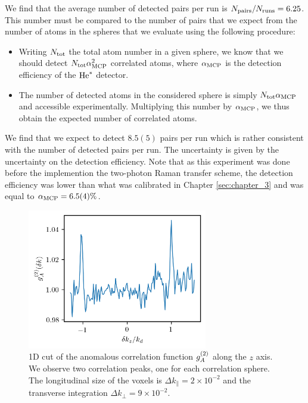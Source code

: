 We find that the average number of detected pairs per run is $N_{\rm{pairs}}/N_{\rm{runs}}=6.25$. This number must be compared to the number of pairs that we expect from the number of atoms in the spheres that we evaluate using the following procedure:

\begin{itemize}
    \item Writing $N_{\rm{tot}}$ the total atom number in a given sphere, we know that we should detect $N_{\rm{tot}} \alpha_{\rm{MCP}}^2$ correlated atoms, where $\alpha_{\rm{MCP}}$ is the detection efficiency of the $\mathrm{He}^*$ detector. 
    \item The number of detected atoms in the considered sphere is simply $N_{\rm{tot}} \alpha_{\rm{MCP}}$ and accessible experimentally. Multiplying this number by $\alpha_{\rm{MCP}}$, we thus obtain the expected number of correlated atoms.
\end{itemize}

We find that we expect to detect $8.5(5)$ pairs per run which is rather consistent with the number of detected pairs per run. The uncertainty is given by the uncertainty on the detection efficiency. Note that as this experiment was done before the implemention the two-photon Raman transfer scheme, the detection efficiency was lower than what was calibrated in Chapter \ref{sec:chapter_3} and was equal to $\alpha_{\rm{MCP}}=6.5(4) \%$.




\begin{figure}
    \centering
    \includegraphics[width=0.7\textwidth]{Fig/Chapter4/kmk_kapitza.png}
    \caption[1D cut of the anomalous correlation function $\gtwo_A$ along the $z$ axis]{1D cut of the anomalous correlation function $\gtwo_A$ along the $z$ axis. We observe two correlation peaks, one for each correlation sphere. The longitudinal size of the voxels is $\Delta k_{\parallel}= 2 \times 10^{-2}$ and the transverse integration $\Delta k_{\perp}= 9 \times 10^{-2}$.}
    \label{fig:kmk_kapitza}
\end{figure}


